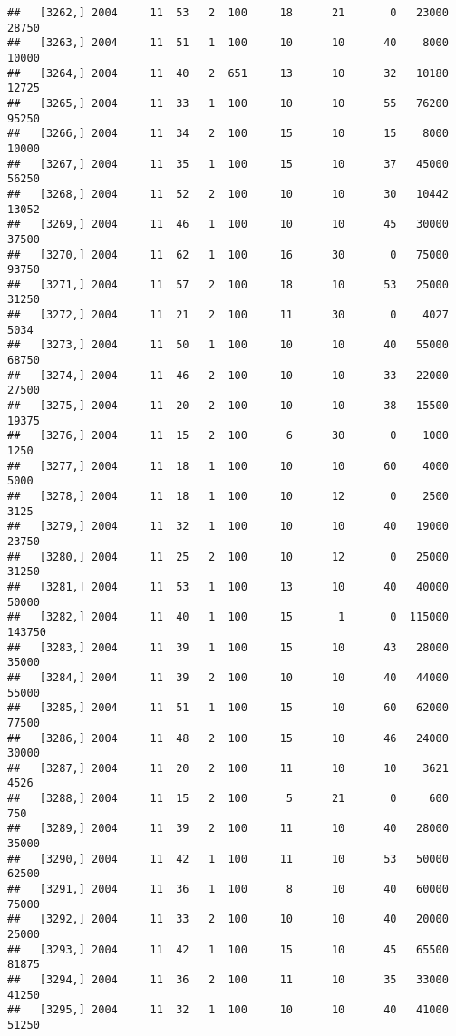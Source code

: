 \documentclass{article}\usepackage[]{graphicx}\usepackage[]{color}
\makeatletter
\newenvironment{kframe}{%
 \def\at@end@of@kframe{}%
 \ifinner\ifhmode%
  \def\at@end@of@kframe{\end{minipage}}%
  \begin{minipage}{\columnwidth}%
 \fi\fi%
 \def\FrameCommand##1{\hskip\@totalleftmargin \hskip-\fboxsep
 \colorbox{shadecolor}{##1}\hskip-\fboxsep
     \hskip-\linewidth \hskip-\@totalleftmargin \hskip\columnwidth}%
 \MakeFramed {\advance\hsize-\width
   \@totalleftmargin\z@ \linewidth\hsize
   \@setminipage}}%
 {\par\unskip\endMakeFramed%
 \at@end@of@kframe}
\newenvironment{knitrout}{}{} %
\makeatother
\begin{document}
\begin{knitrout}
\begin{kframe}
\begin{verbatim}
##   [3262,] 2004     11  53   2  100     18      21       0   23000   28750
##   [3263,] 2004     11  51   1  100     10      10      40    8000   10000
##   [3264,] 2004     11  40   2  651     13      10      32   10180   12725
##   [3265,] 2004     11  33   1  100     10      10      55   76200   95250
##   [3266,] 2004     11  34   2  100     15      10      15    8000   10000
##   [3267,] 2004     11  35   1  100     15      10      37   45000   56250
##   [3268,] 2004     11  52   2  100     10      10      30   10442   13052
##   [3269,] 2004     11  46   1  100     10      10      45   30000   37500
##   [3270,] 2004     11  62   1  100     16      30       0   75000   93750
##   [3271,] 2004     11  57   2  100     18      10      53   25000   31250
##   [3272,] 2004     11  21   2  100     11      30       0    4027    5034
##   [3273,] 2004     11  50   1  100     10      10      40   55000   68750
##   [3274,] 2004     11  46   2  100     10      10      33   22000   27500
##   [3275,] 2004     11  20   2  100     10      10      38   15500   19375
##   [3276,] 2004     11  15   2  100      6      30       0    1000    1250
##   [3277,] 2004     11  18   1  100     10      10      60    4000    5000
##   [3278,] 2004     11  18   1  100     10      12       0    2500    3125
##   [3279,] 2004     11  32   1  100     10      10      40   19000   23750
##   [3280,] 2004     11  25   2  100     10      12       0   25000   31250
##   [3281,] 2004     11  53   1  100     13      10      40   40000   50000
##   [3282,] 2004     11  40   1  100     15       1       0  115000  143750
##   [3283,] 2004     11  39   1  100     15      10      43   28000   35000
##   [3284,] 2004     11  39   2  100     10      10      40   44000   55000
##   [3285,] 2004     11  51   1  100     15      10      60   62000   77500
##   [3286,] 2004     11  48   2  100     15      10      46   24000   30000
##   [3287,] 2004     11  20   2  100     11      10      10    3621    4526
##   [3288,] 2004     11  15   2  100      5      21       0     600     750
##   [3289,] 2004     11  39   2  100     11      10      40   28000   35000
##   [3290,] 2004     11  42   1  100     11      10      53   50000   62500
##   [3291,] 2004     11  36   1  100      8      10      40   60000   75000
##   [3292,] 2004     11  33   2  100     10      10      40   20000   25000
##   [3293,] 2004     11  42   1  100     15      10      45   65500   81875
##   [3294,] 2004     11  36   2  100     11      10      35   33000   41250
##   [3295,] 2004     11  32   1  100     10      10      40   41000   51250

\end{verbatim}
\end{kframe}
\end{knitrout}
\end{document}

